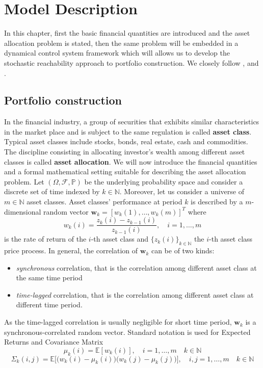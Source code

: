 \chapter{Model Description}
In this chapter, first the basic financial quantities are introduced and the asset allocation problem is stated, then the same problem will be embedded in a dynamical control system framework which will allows us to develop the stochastic reachability approach to portfolio construction. We closely follow \cite{Pola12},\cite{Pola06} and \cite{Pola}.
\section{Portfolio construction}
In the financial industry, a group of securities that exhibits similar characteristics in the market place and is subject to the same regulation is called \textbf{asset class}. Typical asset classes include stocks, bonds, real estate, cash and commodities. The discipline consisting in allocating investor's wealth among different asset classes is called \textbf{asset allocation}. We will now introduce the financial quantities and a formal mathematical setting suitable for describing the asset allocation problem. Let $(\Omega,\mathcal{F},\mathbb{P})$ be the underlying  probability space and consider a discrete set of time indexed by $k \in \mathbb{N}$. Moreover, let us consider a universe of $m \in \mathbb{N}$ asset classes. Asset classes' performance at period $k$ is described by a $m$-dimensional random vector $\bm{w}_k = [w_k(1),\ldots,w_k(m)]^T$ where $$ w_k(i) = \frac{z_k(i)-z_{k-1}(i)}{z_{k-1}(i)}, \quad i = 1,\ldots,m$$
is the rate of return of the $i$-th asset class and $\{z_k(i)\}_{k \in \mathbb{N}}$ the $i$-th asset class price process. In general, the correlation of $\bm{w}_k$ can be of two kinds:
\begin{itemize}
	\item \textit{synchronous} correlation, that is the correlation among different asset class at the same time period
	\item \textit{time-lagged} correlation, that is the correlation among different asset class at different time period.
\end{itemize}
As the time-lagged correlation is usually negligible for short time period, $\bm{w}_k$ is a synchronous-correlated random vector. Standard notation is used for Expected Returns and Covariance Matrix $$\mu_k(i) = \mathbb{E}[w_k(i)], \quad i = 1,\ldots,m \quad k \in \mathbb{N}$$
 $$\Sigma_k(i,j) = \mathbb{E}\Big[\big(w_k(i)-\mu_k(i)\big)\big(w_k(j)-\mu_k(j)\big)\Big], \quad i,j = 1,\ldots,m \quad k \in \mathbb{N}$$
